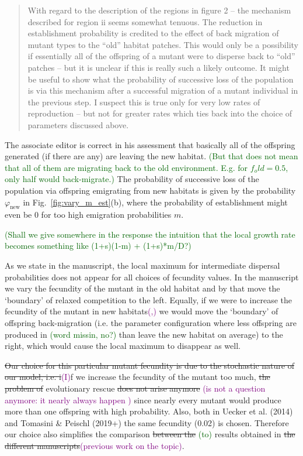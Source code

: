 \documentclass[11pt]{article}
\newenvironment{referee}{\vspace{0.cm} \sffamily \color{colreferee} \begin{quotation} }{\end{quotation} \vspace{0.cm}}
\newcommand{\lmarginpar}[1]{\reversemarginpar\marginpar{\textcolor{colreferee}{\textbf{\textsf{[#1]}}}}}
\newcommand{\addnb}[1]{\refstepcounter{numcom}\lmarginpar{\arabic{numcom}}\label{#1}}
\newcommand{\florence}[1]{\textcolor{purple}{(#1)}}
\newcommand{\hildegard}[1]{\textcolor{darkgreen}{(#1)}}
\newcounter{numcom}
\begin{document}
\begin{referee}
With \addnb{AE5}regard to the description of the regions in figure 2 – the mechanism described for region ii seems somewhat tenuous. The reduction in establishment probability is credited to the effect of back migration of mutant types to the “old” habitat patches. This would only be a possibility if essentially all of the offspring of a mutant were to disperse back to “old” patches – but it is unclear if this is really such a likely outcome.   It might be useful to show what the probability of successive loss of the population is via this mechanism after a successful migration of a mutant individual in the previous step. I suspect this is true only for very low rates of reproduction – but not for greater rates which ties back into the choice of parameters discussed above. 
\end{referee}
%
The associate editor is correct in his assessment that basically all of the offspring generated (if there are any) are leaving the new habitat. \hildegard{But that does not mean that all of them are migrating back to the old environment. E.g. for $f_old=0.5$, only half would back-migrate.} The probability of successive loss of the population via offspring emigrating from new habitats is given by the probability $\varphi_{\text{new}}$ in Fig.~\ref{fig:vary_m_est}(b), where the probability of establishment might even be $0$ for too high emigration probabilities $m$.

\hildegard{Shall we give somewhere in the response the intuition that the local growth rate becomes something like (1+s)(1-m) + (1+s)*m/D?}

As we state in the manuscript, the local maximum for intermediate dispersal probabilities does not appear for all choices of fecundity values. In the manuscript we vary the fecundity of the mutant in the old habitat and by that move the `boundary' of relaxed competition to the left. Equally, if we were to increase the fecundity of the mutant in new habitats\florence{,} we would move the `boundary' of offspring back-migration (i.e. the parameter configuration where less offspring are produced in \hildegard{word missin, no?} than leave the new habitat on average) to the right, which would cause the local maximum to disappear as well.  

\st{Our choice for this particular mutant fecundity is due to the stochastic nature of our model, i.e. i}\florence{I}f we increase the fecundity of the mutant too much, \st{the problem of} evolutionary rescue \st{does not arise anymore} \florence{is not a question anymore: it nearly always happen } since nearly every mutant would produce more than one offspring with high probability. Also, both in Uecker et al. (2014) and Tomasini \& Peischl (2019+) the same fecundity (0.02) is chosen. Therefore our choice also simplifies the comparison \st{between the} \hildegard{to} results obtained in \st{the different manuscripts}\florence{previous work on the topic}.
\end{document}
